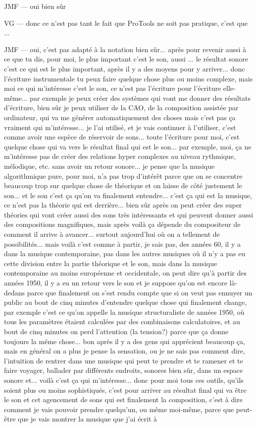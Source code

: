JMF — oui bien sûr 

VG — donc ce n'est pas tant le fait que ProTools ne soit pas pratique, c'est que ... 

JMF — oui, c'est pas adapté à la notation bien sûr... après pour revenir aussi à ce que tu dis, pour moi, le plus important c'est le son, aussi ... le résultat sonore c'est ce qui est le plus important, après il y a des moyens pour y arriver... donc l'écriture instrumentale tu peux faire quelque chose plus ou moins complexe, mais moi ce qui m'intéresse c'est le son, ce n'est pas l'écriture pour l'écriture elle-même... par exemple je peux créer des systèmes qui vont me donner des résultats d'écriture, bien sûr je peux utiliser de la CAO, de la composition assistée par ordinateur, qui va me générer automatiquement des choses mais c'est pas ça vraiment qui m'intéresse... je l'ai utilisé, et je vais continuer à l'utiliser, c'est comme avoir une espèce de réservoir de sons... toute l'écriture pour moi, c'est quelque chose qui va vers le résultat final qui est le son... par exemple, moi, ça ne m'intéresse pas de créer des relations hyper complexes au niveau rythmique, mélodique, etc. sans avoir un retour sonore... je pense que la musique algorithmique pure, pour moi, n'a pas trop d'intérêt parce que on se concentre beaucoup trop sur quelque chose de théorique et on laisse de côté justement le son... et le son c'est ça qu'on va finalement entendre... c'est ça qui est la musique, ce n'est pas la théorie qui est derrière... bien sûr après on peut créer des super théories qui vont créer aussi des sons très intéressants et qui peuvent donner aussi des compositions magnifiques, mais après voilà ça dépende du compositeur de comment il arrive à avancer... surtout aujourd'hui où on a tellement de possibilités... mais voilà c'est comme à partir, je sais pas, des années 60, il y a dans la musique contemporaine, pas dans les autres musiques où il n'y a pas eu cette division entre la partie théorique et le son, mais dans la musique contemporaine au moins européenne et occidentale, on peut dire qu'à partir des années 1950, il y a eu un retour vers le son et je suppose qu'on est encore là-dedans parce que finalement on s'est rendu compte que si on veut pas ennuyer un public au bout de cinq minutes d'entendre quelque chose qui finalement change, par exemple c'est ce qu'on appelle la musique structuraliste de années 1950, où tous les paramètres étaient calculées par des combinaisons calculatoires, et au bout de cinq minutes on perd l'attention (la tension?) parce que ça donne toujours la même chose... bon après il y a des gens qui apprécient beaucoup ça, mais en général on a plus je pense la sensation, ou je ne sais pas comment dire, l'intuition de rentrer dans une musique qui peut te prendre et te ramener et te faire voyager, ballader par différents endroits, sonores bien sûr, dans un espace sonore et... voilà c'est ça qui m'intéresse... donc pour moi tous ces outils, qu'ils soient plus ou moins sophistiqués, c'est pour arriver au résultat final qui va être le son et cet agencement de sons qui est finalement la composition, c'est à dire comment je vais pouvoir prendre quelqu'un, ou même moi-même, parce que peut-être que je vais montrer la musique que j'ai écrit à 